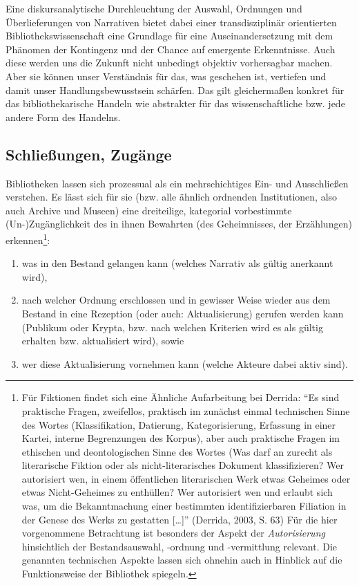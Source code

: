 \documentclass[output=paper]{langscibook}
\begin{document}
Eine diskursanalytische Durchleuchtung der Auswahl, Ordnungen und
Überlieferungen von Narrativen bietet dabei einer transdisziplinär
orientierten Bibliothekswissenschaft eine Grundlage für eine
Auseinandersetzung mit dem Phänomen der Kontingenz und der Chance auf
emergente Erkenntnisse. Auch diese werden uns die Zukunft nicht
unbedingt objektiv vorhersagbar machen. Aber sie können unser
Verständnis für das, was geschehen ist, vertiefen und damit unser
Handlungsbewusstsein schärfen. Das gilt gleichermaßen konkret für das
bibliothekarische Handeln wie abstrakter für das wissenschaftliche bzw.
jede andere Form des Handelns.

\hypertarget{schlieuxdfungen-zuguxe4nge}{%
\subsection*{Schließungen, Zugänge}\label{schlieuxdfungen-zuguxe4nge}}

Bibliotheken lassen sich prozessual als ein mehrschichtiges Ein- und
Ausschließen verstehen. Es lässt sich für sie (bzw. alle ähnlich
ordnenden Institutionen, also auch Archive und Museen) eine dreiteilige,
kategorial vorbestimmte (Un-)Zugänglichkeit des in ihnen Bewahrten (des
Geheimnisses, der Erzählungen) erkennen\footnote{Für Fiktionen findet
  sich eine Ähnliche Aufarbeitung bei Derrida: \enquote{Es sind
  praktische Fragen, zweifellos, praktisch im zunächst einmal
  technischen Sinne des Wortes (Klassifikation, Datierung,
  Kategorisierung, Erfassung in einer Kartei, interne Begrenzungen des
  Korpus), aber auch praktische Fragen im ethischen und deontologischen
  Sinne des Wortes (Was darf an zurecht als literarische Fiktion oder
  als nicht-literarisches Dokument klassifizieren? Wer autorisiert wen,
  in einem öffentlichen literarischen Werk etwas Geheimes oder etwas
  Nicht-Geheimes zu enthüllen? Wer autorisiert wen und erlaubt sich was,
  um die Bekanntmachung einer bestimmten identifizierbaren Filiation in
  der Genese des Werks zu gestatten {[}\ldots{]}} (Derrida, 2003, S. 63)
  Für die hier vorgenommene Betrachtung ist besonders der Aspekt der
  \emph{Autorisierung} hinsichtlich der Bestandsauswahl, -ordnung und
  -vermittlung relevant. Die genannten technischen Aspekte lassen sich
  ohnehin auch in Hinblick auf die Funktionsweise der Bibliothek
  spiegeln.}:

\begin{enumerate}
\def\labelenumi{\arabic{enumi}.}
\item
  was in den Bestand gelangen kann (welches Narrativ als gültig
  anerkannt wird),
\item
  nach welcher Ordnung erschlossen und in gewisser Weise wieder aus dem
  Bestand in eine Rezeption (oder auch: Aktualisierung) gerufen werden
  kann (Publikum oder Krypta, bzw. nach welchen Kriterien wird es als
  gültig erhalten bzw. aktualisiert wird), sowie
\item
  wer diese Aktualisierung vornehmen kann (welche Akteure dabei aktiv
  sind).
\end{enumerate}
\end{document}
